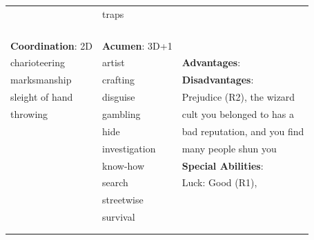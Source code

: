 \documentclass[10pt]{article}
\begin{document}
\begin{table}
\begin{tabular}{m{156pt} m{156pt} m{156pt}}
 \hrulefill & traps                \hrulefill & \\

 \hrulefill &  \hrulefill & \\

 \hrulefill &  \hrulefill & \\

 \hrulefill &  \hrulefill & \\

 \hrulefill &  \hrulefill & \\


\textbf{Coordination}: 2D \hrulefill & \textbf{Acumen}: 3D+1 \hrulefill     & \hrulefill \\

charioteering        \hrulefill & artist               \hrulefill & \textbf{Advantages}: \hrulefill \\

marksmanship         \hrulefill & crafting             \hrulefill & \textbf{Disadvantages}: \hrulefill \\

sleight of hand      \hrulefill & disguise             \hrulefill & Prejudice (R2), the wizard \hrulefill \\

throwing             \hrulefill & gambling             \hrulefill & cult you belonged to has a \hrulefill \\

 \hrulefill & hide                 \hrulefill & bad reputation, and you find \hrulefill \\

 \hrulefill & investigation        \hrulefill & many people shun you \hrulefill \\

 \hrulefill & know-how             \hrulefill & \textbf{Special Abilities}: \hrulefill \\

 \hrulefill & search               \hrulefill & Luck: Good (R1), \hrulefill \\

 \hrulefill & streetwise           \hrulefill &  \hrulefill \\

 \hrulefill & survival             \hrulefill &  \hrulefill \\

 \hrulefill &  \hrulefill &  \hrulefill \\

 \hrulefill &  \hrulefill &  \hrulefill \\


\end{tabular}
\end{table}
\end{document}
